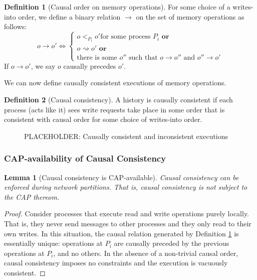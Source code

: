 \documentclass[]             %
{NASA}                       %
\newtheorem{lemma}[theorem]{Lemma}
\theoremstyle{definition}
\newtheorem{definition}{Definition}[section]
\begin{document}
\begin{definition}[Causal order on memory operations]
  \label{def:memorycausalprecedence}
  For some choice of a writes-into order, we define a binary relation
  $\to$ on the set of memory operations as follows:
  \[o \to o' \iff
  \begin{cases}
    o <_{P_i} o' \textrm{for some process $P_i$}
    \textbf{ or} \\
    o \rightsquigarrow o'
    \textbf{ or} \\
    \textrm{there is some } o'' \textrm{ such that } o \to o'' \textrm{ and } o'' \to o'
  \end{cases}
  \]
  If $o \to o'$, we say $o$ causally precedes $o'$.
\end{definition}

We can now define causally consistent executions of memory operations.

\begin{definition}[Causal consistency]
  \label{def:causalconsistency}
  A history is causally consistent if each process (acts like it) sees
  write requests take place in some order that is consistent with
  causal order for some choice of writes-into order.
\end{definition}

\begin{figure}[p]
  \begin{subfigure}{1\textwidth}
    \centering
    
    \caption{}
    \label{fig:smEx1L1}
  \end{subfigure}

  \begin{subfigure}{1\textwidth}
    
    \caption{}
    \label{fig:smEx5}
  \end{subfigure}

  \caption{PLACEHOLDER: Causally consistent and inconsistent executions}
  \label{fig:smEx3}
\end{figure}

\afterpage{\clearpage}

\subsubsection{CAP-availability of Causal Consistency}
\label{the-cap-theorem}

\begin{lemma}[Causal consistency is CAP-available]
  \label{thm:cap-causal}
  Causal consistency can be enforced during network partitions. That
  is, causal consistency is not subject to the CAP thereom.
\end{lemma}
\begin{proof}
  Consider processes that execute read and write operations purely
  locally. That is, they never send messages to other processes and
  they only read to their own writes. In this situation, the causal
  relation generated by Definition \ref{def:memorycausalprecedence} is
  essentially unique: operations at $P_i$ are causally preceded by the
  previous operations at $P_i$, and no others. In the absence of a
  non-trivial causal order, causal consistency imposes no constraints
  and the execution is vacuously consistent.
\end{proof}
\end{document}
